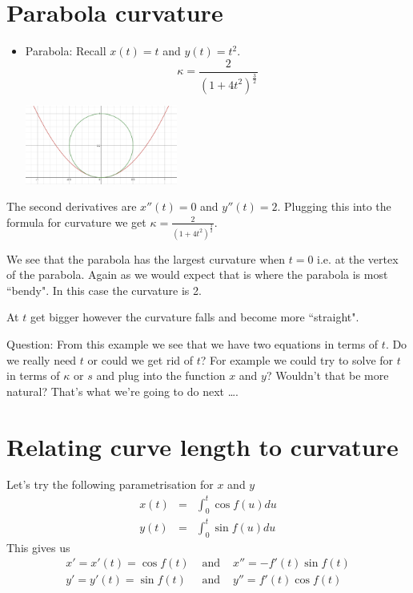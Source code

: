 \documentclass[12pt]{article} %
\theoremstyle{definition}
\theoremstyle{theorem}
\begin{document}
\section{Parabola curvature}
\begin{tcolorbox}
	\begin{itemize}	
		\item Parabola: Recall $x(t)=t$ and $y(t)=t^2$. 
		\[
		\kappa = \frac{2}{\left(1 + 4t^2 \right) ^ \frac{3}{2}}
		\]
		\begin{minipage}{\linewidth}
			\centering
			\includegraphics[width=50mm, scale=0.4]{Parabola.png}
		\end{minipage}
	\end{itemize}
\end{tcolorbox}
The second derivatives are $x''(t)=0$ and $y''(t)=2$. Plugging this into the formula for curvature we get $\kappa = \frac{2}{\left(1 + 4t^2 \right) ^ \frac{3}{2}}$.

We see that the parabola has the largest curvature when $t=0$ i.e. at the vertex of the parabola. Again as we would expect that is where the parabola is most ``bendy". In this case the curvature is 2.

At $t$ get bigger however the curvature falls and become more ``straight".

Question: From this example we see that we have two equations in terms of $t$. Do we really need $t$ or could we get rid of $t$? For example we could try to solve for $t$ in terms of $\kappa$ or $s$ and plug into the function $x$ and $y$? Wouldn't that be more  natural? That's what we're going to do next \dots.

\section{Relating curve length to curvature}
\begin{tcolorbox}
	Let's try the following parametrisation for $x$ and $y$
	\begin{eqnarray*}
		x(t) &=& \int_{0}^{t} \cos f(u) du \\
		y(t) &=& \int_{0}^{t} \sin f(u) du
	\end{eqnarray*}
	This gives us
	\begin{eqnarray*}
		x' = x'(t) = \cos f(t) &\mbox{ and }& x''=-f'(t) \sin f(t) \\
		y' = y'(t) = \sin f(t) &\mbox{ and }& y''=f'(t) \cos f(t)
	\end{eqnarray*}
\end{tcolorbox}
\end{document}
